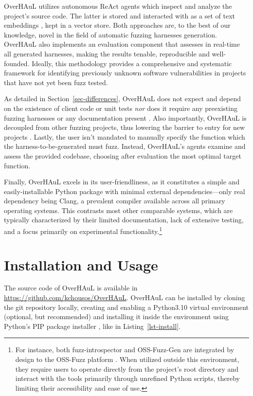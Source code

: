 \documentclass[
  a4paper,
]{scrreprt}
\theoremstyle{definition}
\theoremstyle{remark}
\begin{document}
OverHAuL utilizes autonomous ReAct agents which inspect and analyze the
project's source code. The latter is stored and interacted with as a set
of text embeddings \autocite{mikolov2013}, kept in a vector store. Both
approaches are, to the best of our knowledge, novel in the field of
automatic fuzzing harnesses generation. OverHAuL also implements an
evaluation component that assesses in real-time all generated harnesses,
making the results tenable, reproducible and well-founded. Ideally, this
methodology provides a comprehensive and systematic framework for
identifying previously unknown software vulnerabilities in projects that
have not yet been fuzz tested.

As detailed in Section~\ref{sec-differences}, OverHAuL does not expect
and depend on the existence of client code or unit tests
\autocite{utopia,fudge,fuzzgen} \emph{nor} does it require any
preexisting fuzzing harnesses \autocite{oss-fuzz-gen} or any
documentation present \autocite{sun2024}. Also importantly, OverHAuL is
decoupled from other fuzzing projects, thus lowering the barrier to
entry for new projects \autocite{oss-fuzz-gen,oss-fuzz}. Lastly, the
user isn't mandated to manually specify the function which the
harness-to-be-generated must fuzz. Instead, OverHAuL's agents examine
and assess the provided codebase, choosing after evaluation the most
optimal target function.

Finally, OverHAuL excels in its user-friendliness, as it constitutes a
simple and easily-installable Python package with minimal external
dependencies---only real dependency being Clang, a prevalent compiler
available across all primary operating systems. This contrasts most
other comparable systems, which are typically characterized by their
limited documentation, lack of extensive testing, and a focus primarily
on experimental functionality.\footnote{For instance, both
  fuzz-introspector and OSS-Fuzz-Gen are integrated by design to the
  OSS-Fuzz platform \autocite{fuzz-introspector,oss-fuzz-gen,oss-fuzz}.
  When utilized outside this environment, they require users to operate
  directly from the project's root directory and interact with the tools
  primarily through unrefined Python scripts, thereby limiting their
  accessibility and ease of use.}

\section{Installation and Usage}\label{sec-install}

The source code of OverHAuL is available in
\url{https://github.com/kchousos/OverHAuL}. OverHAuL can be installed by
cloning the git repository locally, creating and enabling a Python3.10
virtual environment \autocite{venv} (optional, but recommended) and
installing it inside the environment using Python's PIP package
installer \autocite{pip}, like in Listing~\ref{lst-install}.
\end{document}
